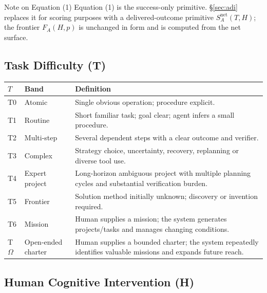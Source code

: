 \documentclass[11pt]{article}
\theoremstyle{definition}
\newcommand{\Om}{\ensuremath{\Omega}}
\newcommand{\FA}{\ensuremath{F_A(H,p)}}
\begin{document}
\begin{addedbox}{Note on Equation (1)}
Equation (1) is the success-only primitive. \S\ref{sec:adi} replaces it for scoring purposes with a delivered-outcome primitive $S^{\text{net}}_A(T,H)$; the frontier \FA{} is unchanged in form and is computed from the net surface.
\end{addedbox}

\subsection{Task Difficulty (T)}

\begin{table}[h]
\centering\small
\begin{tabularx}{\textwidth}{@{}llY@{}}
\toprule
$T$ & Band & Definition \\
\midrule
T0 & Atomic & Single obvious operation; procedure explicit. \\
T1 & Routine & Short familiar task; goal clear; agent infers a small procedure. \\
T2 & Multi-step & Several dependent steps with a clear outcome and verifier. \\
T3 & Complex & Strategy choice, uncertainty, recovery, replanning or diverse tool use. \\
T4 & Expert project & Long-horizon ambiguous project with multiple planning cycles and substantial verification burden. \\
T5 & Frontier & Solution method initially unknown; discovery or invention required. \\
T6 & Mission & Human supplies a mission; the system generates projects/tasks and manages changing conditions. \\
T\Om{} & Open-ended charter & Human supplies a bounded charter; the system repeatedly identifies valuable missions and expands future reach. \\
\bottomrule
\end{tabularx}
\end{table}

\subsection{Human Cognitive Intervention (H)}
\end{document}
